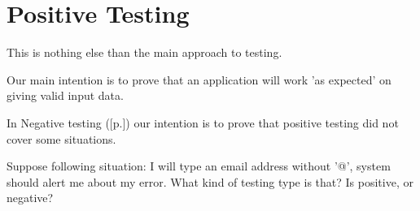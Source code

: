 \section{Positive Testing}
\label{sec:Positive Testing}

This is nothing else than the main approach to testing.

Our main intention is to prove that an application will work 'as expected' on giving valid input data.

In Negative testing ([p.\pageref{sec:Negative Testing}]) our intention is to prove that positive testing did not cover some situations.

Suppose following situation: I will type an email address without '@', system should alert me about my error. What kind of testing type is that? Is positive, or negative?